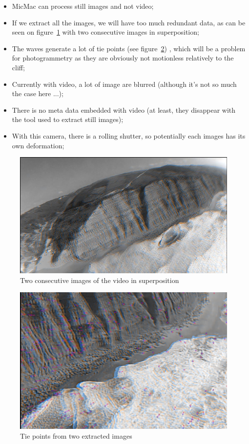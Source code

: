 \begin{itemize}
   \item MicMac can process still images and not video;
   \item If we extract all the images, we will have too much redundant data, as can be seen
         on figure~\ref{fig:GoProCloseWave} with two consecutive images in superposition;
   \item The waves generate a lot of tie points (see figure~\ref{fig:GoProSIFT}) , which will be 
         a problem for photogrammetry as  they are 
         obviously not motionless relatively to the cliff;
          
   \item Currently with video, a lot of image are blurred (although it's not so much the case here ...);
   \item  There is no meta data embedded with video (at least, they disappear with the tool used to extract
          still images);
   \item  With this camera, there is a rolling shutter, so potentially each images has its own deformation;
\end{itemize}


\begin{figure}
\centering
\includegraphics[width=0.80\linewidth]{FIGS/GoProVideo/Proches.jpg}
\caption{Two consecutive images of the video in superposition}
\label{fig:GoProCloseWave}
\end{figure}


\begin{figure}
\centering
\includegraphics[width=0.90\linewidth]{FIGS/GoProVideo/SIFT.jpg}
\caption{Tie points from two extracted images}
\label{fig:GoProSIFT}
\end{figure}


